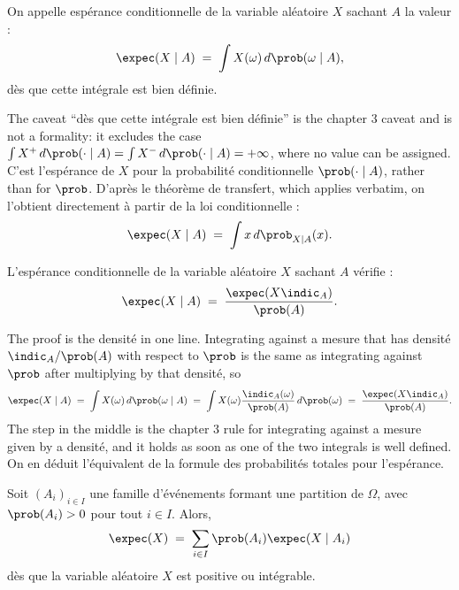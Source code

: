 \begin{definition}
  On appelle espérance conditionnelle de la variable aléatoire $X$ sachant $A$
  la valeur :
  \[
    \expec(X \mid A) \;=\; \int X(\omega) \, d\prob(\omega \mid A),
  \]
  dès que cette intégrale est bien définie.
\end{definition}

The caveat ``dès que cette intégrale est bien définie'' is the chapter 3 caveat and
is not a formality: it excludes the case
$\int X^{+} \, d\prob(\cdot \mid A) = \int X^{-} \, d\prob(\cdot \mid A) = +\infty$,
where no value can be assigned. C'est l'espérance de $X$ pour la probabilité
conditionnelle $\prob(\cdot \mid A)$, rather than for $\prob$. D'après le théorème de
transfert, which applies verbatim, on l'obtient directement à partir de la loi
conditionnelle :
\begin{equation*}
  \expec(X \mid A) \;=\; \int x \, d\prob_{X \mid A}(x) .
\end{equation*}

\begin{prop}
  L'espérance conditionnelle de la variable aléatoire $X$ sachant $A$ vérifie :
  \[
    \expec(X \mid A) \;=\; \frac{\expec(X \indic_{A})}{\prob(A)} .
  \]
\end{prop}

The proof is the densité in one line. Integrating against a mesure that has
densité $\indic_{A}/\prob(A)$ with respect to $\prob$ is the same as integrating
against $\prob$ after multiplying by that densité, so
\[
  \expec(X \mid A)
  \;=\; \int X(\omega) \, d\prob(\omega \mid A)
  \;=\; \int X(\omega) \frac{\indic_{A}(\omega)}{\prob(A)} \, d\prob(\omega)
  \;=\; \frac{\expec(X \indic_{A})}{\prob(A)} .
\]
The step in the middle is the chapter 3 rule for integrating against a mesure
given by a densité, and it holds as soon as one of the two integrals is well
defined.\\

On en déduit l'équivalent de la formule des probabilités totales pour l'espérance.

\begin{prop}
  Soit $(A_{i})_{i \in I}$ une famille d'événements formant une partition de
  $\Omega$, avec $\prob(A_{i}) > 0$ pour tout $i \in I$. Alors,
  \[
    \expec(X) \;=\; \sum_{i \in I} \prob(A_{i}) \expec(X \mid A_{i})
  \]
  dès que la variable aléatoire $X$ est positive ou intégrable.
\end{prop}

